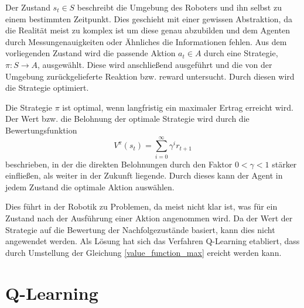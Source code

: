 Der Zustand $s_t \in S$ beschreibt die Umgebung des Roboters und ihn selbst zu einem bestimmten Zeitpunkt. Dies geschieht mit einer gewissen Abstraktion, da die Re\-a\-li\-tät meist zu komplex ist um diese genau abzubilden und dem Agenten durch Mess\-un\-ge\-nau\-ig\-keiten oder Ähnliches die Informationen fehlen. Aus dem vorliegenden Zustand wird die passende Aktion $a_t \in A$ durch eine Strategie, $\pi: S \rightarrow A$, ausgewählt. Diese wird anschließend ausgeführt und die von der Umgebung zurückgelieferte Reaktion bzw. reward untersucht. Durch diesen wird die Strategie optimiert. \cite{Ertel_2013}\par
Die Strategie $\pi$ ist optimal, wenn langfristig ein maximaler Ertrag erreicht wird. Der Wert bzw. die Belohnung der  optimale Strategie wird durch die Bewertungsfunktion 
\begin{equation}
	\label{value_function_max}
	V^{\pi}(s_t) = \sum_{i=0}^{\infty}\gamma^{i}r_{t+1}
\end{equation}
beschrieben, in der die direkten Belohnungen durch den Faktor $0 < \gamma < 1$ stärker einfließen, als weiter in der Zukunft liegende. Durch dieses kann der Agent in jedem Zustand die optimale Aktion auswählen. \cite{Ertel_2013}\par
Dies führt in der Robotik zu Problemen, da meist nicht klar ist, was für ein Zustand nach der Ausführung einer Aktion angenommen wird. Da der Wert der Strategie auf die Bewertung der Nachfolgezustände basiert, kann dies nicht angewendet werden. Als Lösung hat sich das Verfahren Q-Learning etabliert, dass durch Umstellung der Gleichung \ref{value_function_max} ereicht werden kann.

\section{Q-Learning} %
\label{sec:q_learning}

